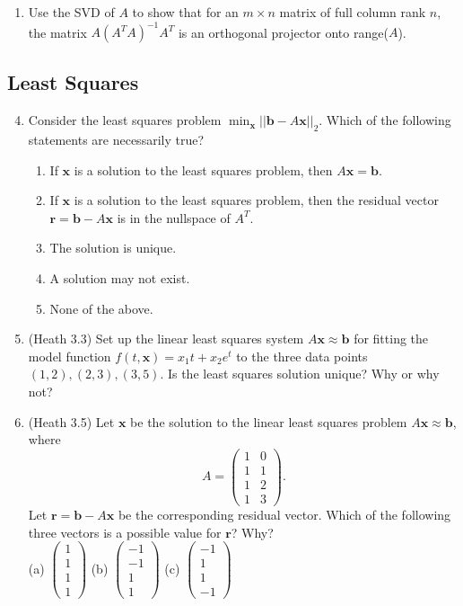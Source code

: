 \documentclass{article}
\renewcommand{\vec}[1]{\mathbf{#1}}
\newcommand{\x}{\vec{x}}
\renewcommand{\r}{\vec{r}}
\renewcommand{\b}{\vec{b}}
\begin{document}
\begin{enumerate}
\item Use the SVD of $A$ to show that for an $m \times n$ matrix of full column rank $n$, the matrix $A (A^TA)^{-1} A^T$ is an orthogonal
  projector onto range($A$).
\end{enumerate}

\subsection*{Least Squares}
\begin{enumerate}
\setcounter{enumi}{3}

\item Consider the least squares problem $\min_\x ||\b - A\x||_2$.  Which of the following statements are
  necessarily true?
\begin{enumerate}
\item If $\x$ is a solution to the least squares problem, then $A\x = \b$.
\item If $\x$ is a solution to the least squares problem, then the residual vector $\r = \b - A \x$ is in the nullspace of $A^T$.
\item The solution is unique.
\item A solution may not exist.
\item None of the above.
\end{enumerate}

\item (Heath 3.3) Set up the linear least squares system $A\vec{x} \approx \vec{b}$ for fitting the model function $f(t,\vec{x}) = x_1 t + x_2 e^t$ to the three data points $(1,2),
  (2,3), (3,5)$.  Is the least squares solution unique? Why or why not?

\item (Heath 3.5) Let $\vec{x}$ be the solution to the linear least squares problem $A\vec{x} \approx \vec{b}$, where
$$
A = \begin{pmatrix}
1 & 0 \\ 1 & 1 \\ 1 & 2 \\ 1 & 3
\end{pmatrix}.
$$
Let $\vec{r} = \vec{b} - A\vec{x}$ be the corresponding residual vector.  Which of the following three vectors is a possible value for $\vec{r}$?  Why?\\
(a) $\begin{pmatrix} 1 \\ 1 \\ 1 \\ 1 \end{pmatrix}$ \quad (b) $\begin{pmatrix} -1 \\ -1 \\ 1 \\ 1 \end{pmatrix}$ \quad (c) $\begin{pmatrix} -1 \\ 1 \\ 1 \\ -1 \end{pmatrix}$

\end{enumerate}
\end{document}
